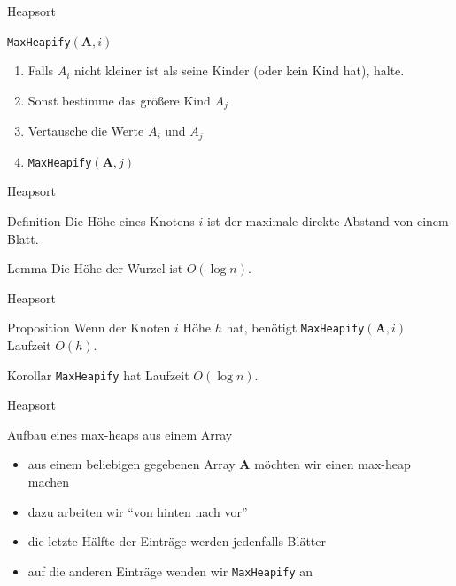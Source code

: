 \documentclass[aspectratio=1610, 11pt]{beamer}
\renewcommand{\vec}[1]{\boldsymbol{#1}}
\newcommand\vA{\vec A}
\begin{document}
\begin{frame}{Heapsort}
	\begin{exampleblock}{{\tt MaxHeapify}$(\vA,i)$}
		\begin{enumerate}
			\item Falls $A_i$ nicht kleiner ist als seine Kinder (oder kein Kind hat), halte.
			\item Sonst bestimme das gr\"o\ss ere Kind $A_j$
			\item Vertausche die Werte $A_i$ und $A_j$
			\item {\tt MaxHeapify}$(\vA,j)$
		\end{enumerate}
	\end{exampleblock}
\end{frame}

\begin{frame}{Heapsort}
	\begin{block}{Definition}
		Die \alert{H\"ohe} eines Knotens $i$ ist der maximale direkte Abstand von einem Blatt.
	\end{block}
	\begin{block}{Lemma}
		Die H\"ohe der Wurzel ist $O(\log n)$.		
	\end{block}
\end{frame}

\begin{frame}{Heapsort}
	\begin{block}{Proposition}
		Wenn der Knoten $i$ H\"ohe $h$ hat, ben\"otigt {\tt MaxHeapify}$(\vA,i)$ Laufzeit $O(h)$.
	\end{block}
	\begin{block}{Korollar}
		{\tt MaxHeapify} hat Laufzeit $O(\log n)$.
	\end{block}
\end{frame}

\begin{frame}{Heapsort}
	\begin{exampleblock}{Aufbau eines max-heaps aus einem Array}
		\begin{itemize}
			\item aus einem beliebigen gegebenen Array $\vA$ m\"ochten wir einen max-heap machen
			\item dazu arbeiten wir ``von hinten nach vor''
			\item die letzte H\"alfte der Eintr\"age werden jedenfalls Bl\"atter
			\item auf die anderen Eintr\"age wenden wir {\tt MaxHeapify} an
		\end{itemize}
	\end{exampleblock}
\end{frame}
\end{document}
